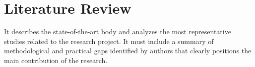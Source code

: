 \section{Literature Review}
    It describes the state-of-the-art body and analyzes the most representative studies related to the research project. It must include a summary of methodological and practical gaps identified by authors that clearly positions the main contribution of the research.